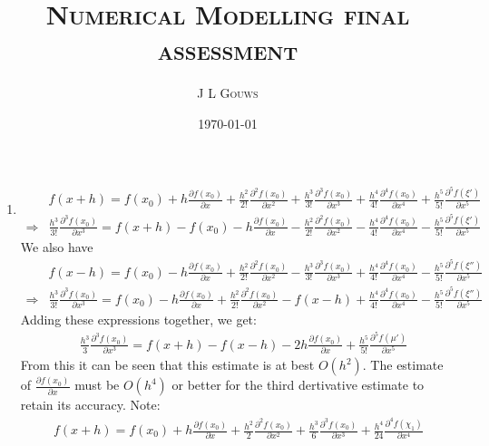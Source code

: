 \documentclass[12pt,a4]{article}
\title{
\textsc{Numerical Modelling final assessment}
}
\author{\textsc{J L Gouws}
}
\date{\today
\\[1cm]}
\begin{document}
\thispagestyle{empty}

\maketitle

\begin{enumerate}
  \item
    \begin{align*}
                  & f(x + h) = f(x_0) + h \frac{\partial f(x_0)}{\partial x} + \frac{h^2}{2!} \frac{\partial^2 f(x_0)}{\partial x^2} + \frac{h^3}{3!} \frac{\partial^3 f(x_0)}{\partial x^3} + \frac{h^4}{4!} \frac{\partial^4 f(x_0)}{\partial x^4} + \frac{h^5}{5!} \frac{\partial^5 f(\xi ')}{\partial x^5}\\
      \Rightarrow & \frac{h^3}{3!} \frac{\partial^3 f(x_0)}{\partial x^3} = f(x + h) - f(x_0) - h \frac{\partial f(x_0)}{\partial x} - \frac{h^2}{2!} \frac{\partial^2 f(x_0)}{\partial x^2} - \frac{h^4}{4!} \frac{\partial^4 f(x_0)}{\partial x^4} - \frac{h^5}{5!} \frac{\partial^5 f(\xi')}{\partial x^5}
    \end{align*}
    We also have
    \begin{align*}
                  & f(x - h) = f(x_0) - h \frac{\partial f(x_0)}{\partial x} + \frac{h^2}{2!} \frac{\partial^2 f(x_0)}{\partial x^2} - \frac{h^3}{3!} \frac{\partial^3 f(x_0)}{\partial x^3} + \frac{h^4}{4!} \frac{\partial^4 f(x_0)}{\partial x^4} - \frac{h^5}{5!} \frac{\partial^5 f(\xi'')}{\partial x^5}\\
      \Rightarrow & \frac{h^3}{3!} \frac{\partial^3 f(x_0)}{\partial x^3} = f(x_0) - h \frac{\partial f(x_0)}{\partial x} + \frac{h^2}{2!} \frac{\partial^2 f(x_0)}{\partial x^2} - f(x - h) + \frac{h^4}{4!} \frac{\partial^4 f(x_0)}{\partial x^4} - \frac{h^5}{5!} \frac{\partial^5 f(\xi'')}{\partial x^5}
    \end{align*}
    Adding these expressions together, we get:
    \begin{align}
      & \frac{h^3}{3} \frac{\partial^3 f(x_0)}{\partial x^3} = f(x + h) - f(x - h) - 2 h \frac{\partial f(x_0)}{\partial x} + \frac{h^5}{5!} \frac{\partial^5 f(\mu')}{\partial x^5} \label{eq:thirdDevFirst}
    \end{align}
    From this it can be seen that this estimate is at best $O(h^2)$.
    The estimate of $\frac{\partial f(x_0)}{\partial x}$ must be $O(h^4)$ or better for the third dertivative estimate to retain its accuracy.
    Note:
    \begin{align*}
      f(x + h) = f(x_0) + h \frac{\partial f(x_0)}{\partial x} + \frac{h^2}{2} \frac{\partial^2 f(x_0)}{\partial x^2} + \frac{h^3}{6} \frac{\partial^3 f(x_0)}{\partial x^3} + \frac{h^4}{24} \frac{\partial^4 f(\chi_1)}{\partial x^4}

\end{align*}
\end{enumerate}
\end{document}
